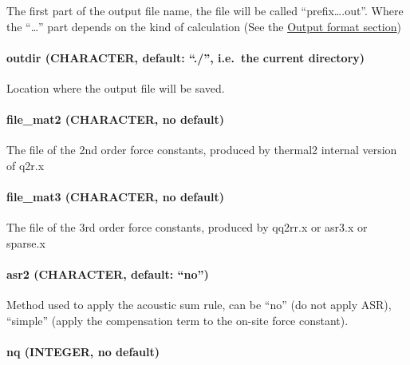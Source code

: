 \documentclass[
]{article}
\begin{document}
The first part of the output file name, the file will be called
\enquote{prefix\ldots.out}. Where the \enquote{\ldots{}} part depends on
the kind of calculation (See the
\protect\hyperlink{output-format-2}{Output format section})

\hypertarget{outdir-character-default-.-i.e.-the-current-directory-2}{%
\paragraph{\texorpdfstring{outdir (CHARACTER, default: \enquote{./},
i.e.~the current
directory)}{outdir (CHARACTER, default: ``./'', i.e.~the current directory)}}\label{outdir-character-default-.-i.e.-the-current-directory-2}}

Location where the output file will be saved.

\hypertarget{file_mat2-character-no-default-1}{%
\paragraph{file\_mat2 (CHARACTER, no
default)}\label{file_mat2-character-no-default-1}}

The file of the 2nd order force constants, produced by thermal2 internal
version of q2r.x

\hypertarget{file_mat3-character-no-default}{%
\paragraph{file\_mat3 (CHARACTER, no
default)}\label{file_mat3-character-no-default}}

The file of the 3rd order force constants, produced by qq2rr.x or asr3.x
or sparse.x

\hypertarget{asr2-character-default-no-2}{%
\paragraph{\texorpdfstring{asr2 (CHARACTER, default:
\enquote{no})}{asr2 (CHARACTER, default: ``no'')}}\label{asr2-character-default-no-2}}

Method used to apply the acoustic sum rule, can be \enquote{no} (do not
apply ASR), \enquote{simple} (apply the compensation term to the on-site
force constant).

\hypertarget{nq-integer-no-default-1}{%
\paragraph{nq (INTEGER, no default)}\label{nq-integer-no-default-1}}
\end{document}
